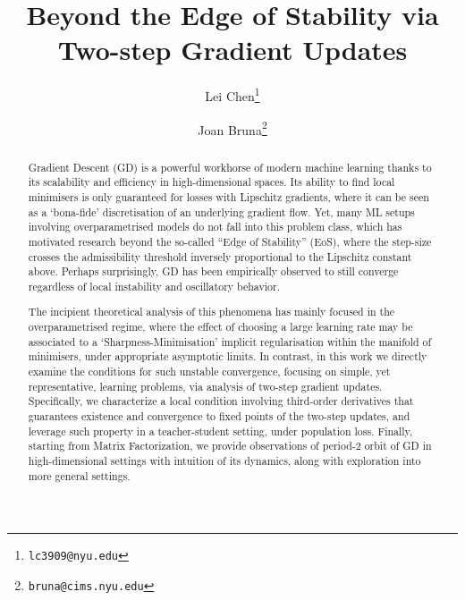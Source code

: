 \documentclass{article}
\title{Beyond the Edge of Stability via Two-step Gradient Updates}
\author[a]{Lei Chen\footnote{\texttt{lc3909@nyu.edu}}}
\author[a,b]{Joan Bruna\footnote{\texttt{bruna@cims.nyu.edu}}}
\affil[a]{Courant Institute of Mathematical Sciences, New York
  University, New York}
\affil[b]{Center for Data Science, New York University, New York}
\theoremstyle{plain}
\theoremstyle{remark}
\begin{document}
\maketitle


\begin{abstract}
Gradient Descent (GD) is a powerful workhorse of modern machine learning thanks to its scalability and efficiency in high-dimensional spaces. Its ability to find local minimisers is only guaranteed for losses with Lipschitz gradients, where it can be seen as a `bona-fide' discretisation of an underlying gradient flow. Yet, many ML setups involving overparametrised models do not fall into this problem class, which has motivated research beyond the so-called ``Edge of Stability'' (EoS), where the step-size crosses the admissibility threshold inversely proportional to the Lipschitz constant above. Perhaps surprisingly, GD has been empirically observed to still converge regardless of local instability and oscillatory behavior.

The incipient theoretical analysis of this phenomena has mainly focused in the overparametrised regime, where the effect of choosing a large learning rate may be associated to a `Sharpness-Minimisation' implicit regularisation within the manifold of minimisers, under appropriate asymptotic limits. In contrast, in this work we directly examine the conditions for such unstable convergence, focusing on simple, yet representative, learning problems, via analysis of two-step gradient updates. Specifically, we characterize a local condition involving third-order derivatives that guarantees existence and convergence to fixed points of the two-step updates, and leverage such property in a teacher-student setting, under population loss. Finally, starting from Matrix Factorization, 
we provide observations of period-2 orbit of GD in high-dimensional settings with intuition of its dynamics, along with exploration into more general settings.



\end{abstract}
\end{document}
